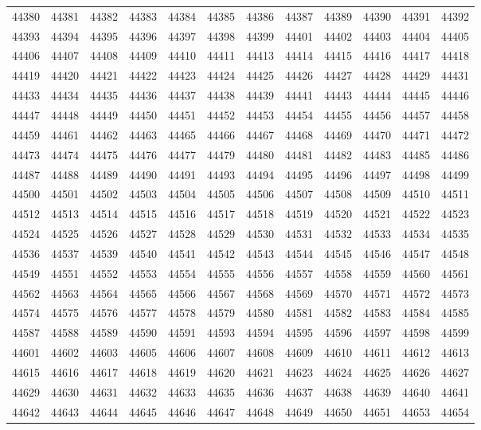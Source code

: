 \begin{center}
\begin{longtable}{llllllllllll}
44380 &44381 &44382 &44383 &44384 &44385 &44386 &44387 &44389 &44390 &44391 &44392 \\
44393 &44394 &44395 &44396 &44397 &44398 &44399 &44401 &44402 &44403 &44404 &44405 \\
44406 &44407 &44408 &44409 &44410 &44411 &44413 &44414 &44415 &44416 &44417 &44418 \\
44419 &44420 &44421 &44422 &44423 &44424 &44425 &44426 &44427 &44428 &44429 &44431 \\
44433 &44434 &44435 &44436 &44437 &44438 &44439 &44441 &44443 &44444 &44445 &44446 \\
44447 &44448 &44449 &44450 &44451 &44452 &44453 &44454 &44455 &44456 &44457 &44458 \\
44459 &44461 &44462 &44463 &44465 &44466 &44467 &44468 &44469 &44470 &44471 &44472 \\
44473 &44474 &44475 &44476 &44477 &44479 &44480 &44481 &44482 &44483 &44485 &44486 \\
44487 &44488 &44489 &44490 &44491 &44493 &44494 &44495 &44496 &44497 &44498 &44499 \\
44500 &44501 &44502 &44503 &44504 &44505 &44506 &44507 &44508 &44509 &44510 &44511 \\
44512 &44513 &44514 &44515 &44516 &44517 &44518 &44519 &44520 &44521 &44522 &44523 \\
44524 &44525 &44526 &44527 &44528 &44529 &44530 &44531 &44532 &44533 &44534 &44535 \\
44536 &44537 &44539 &44540 &44541 &44542 &44543 &44544 &44545 &44546 &44547 &44548 \\
44549 &44551 &44552 &44553 &44554 &44555 &44556 &44557 &44558 &44559 &44560 &44561 \\
44562 &44563 &44564 &44565 &44566 &44567 &44568 &44569 &44570 &44571 &44572 &44573 \\
44574 &44575 &44576 &44577 &44578 &44579 &44580 &44581 &44582 &44583 &44584 &44585 \\
44587 &44588 &44589 &44590 &44591 &44593 &44594 &44595 &44596 &44597 &44598 &44599 \\
44601 &44602 &44603 &44605 &44606 &44607 &44608 &44609 &44610 &44611 &44612 &44613 \\
44615 &44616 &44617 &44618 &44619 &44620 &44621 &44623 &44624 &44625 &44626 &44627 \\
44629 &44630 &44631 &44632 &44633 &44635 &44636 &44637 &44638 &44639 &44640 &44641 \\
44642 &44643 &44644 &44645 &44646 &44647 &44648 &44649 &44650 &44651 &44653 &44654 \\

\end{longtable}
\end{center}
